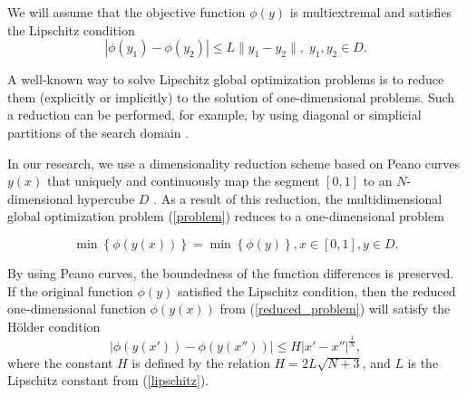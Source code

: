 \documentclass[runningheads]{llncs}
\begin{document}
We will assume that the objective function $\phi(y)$ is multiextremal and satisfies the Lipschitz condition
\begin{equation}\label{lipschitz} 
| \phi (y_1)-\phi (y_2) | \leq L \| y_1-y_2 \|, \; y_1,y_2 \in D.
\end{equation}

A well-known way to solve Lipschitz global optimization problems is to reduce them (explicitly or implicitly) to the solution of one-dimensional problems. Such a reduction can be performed, for example, by using diagonal or simplicial partitions of the search domain \cite{PaulaviciusZilinskas2014,Sergeyev2017}.

In our research, we use a dimensionality reduction scheme based on Peano curves $y(x)$ that uniquely and continuously map the segment $[0,1]$ to an $N$-dimensional hypercube $D$ \cite{Strongin2000}. As a result of this reduction, the multidimensional global optimization problem (\ref{problem}) reduces to a one-dimensional problem

\begin{equation} \label{reduced_problem}
\min \left\{\phi(y(x))\right\} = \min \left\{\phi(y)\right\}, x \in [0,1],  y \in D.
\end{equation}

By using Peano curves, the boundedness of the function differences is preserved. If the original function $\phi(y)$ satisfied the Lipschitz condition, then the reduced one-dimensional function $\phi(y(x))$ from (\ref{reduced_problem}) will satisfy the H{\"o}lder condition
\begin{equation}\label{holder} 
| \phi (y(x'))-\phi (y(x'')) | \leq H | x' - x''|^\frac{1}{N},
\end{equation}
where the constant $H$ is defined by the relation $H=2L\sqrt{N+3}$, and $L$ is the Lipschitz constant from (\ref{lipschitz}).  
\end{document}
